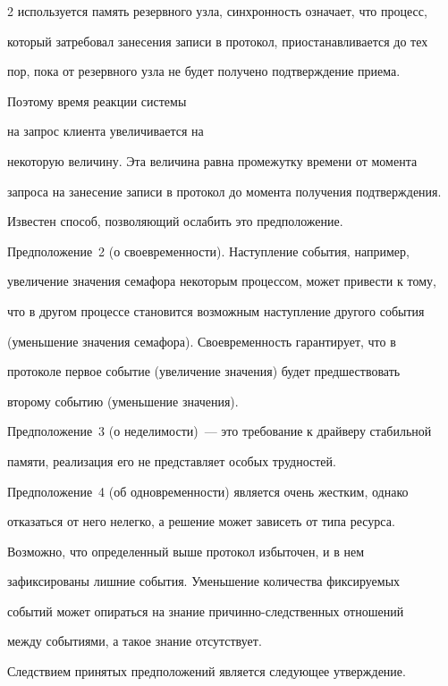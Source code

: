 \begin{multicols}{2}
используется память резервного \mbox{узла}, синхронность означает, что процесс,

который затребовал занесения записи в протокол, приостанавливается до тех

пор, пока от резервного узла не будет получено подтверждение приема.

Поэтому время реакции системы

 на запрос клиента  увеличивается на

некоторую величину. Эта величина равна промежутку времени от момента

запроса на занесение записи в протокол до момента получения подтверждения.

Известен способ, позволяющий ослабить это предположение.



Предположение~2 (о своевременности). Наступление события,  например,

увеличение значения семафора некоторым процессом, может привести к тому,

что в другом процессе становится возможным наступление другого события

(уменьшение значения семафора). Своевременность гарантирует, что в

протоколе первое событие (увеличение значения) будет пред\-шес\-т\-во\-вать

второму событию (уменьшение значения).



Предположение~3 (о неделимости)~--- это требование к драйверу стабильной

памяти, реализация его не представляет особых трудностей.



Предположение~4 (об одновременности) явля\-ет\-ся очень жестким, однако

отказаться от него нелегко, а решение может зависеть от типа ресурса.



Возможно, что определенный выше протокол избыточен,  и в нем

зафиксированы лишние события. Уменьшение количества фиксируемых

событий  может опираться на знание причинно-следственных отношений

между событиями, а такое знание отсутствует.



Следствием принятых предположений является следующее утверждение.




\end{multicols}
